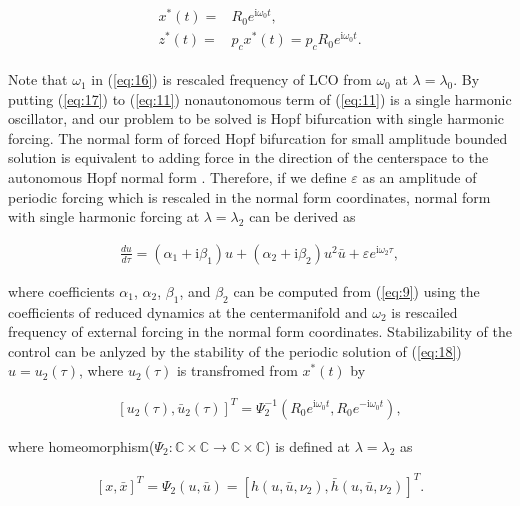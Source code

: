\documentclass[openacc]{rsproca_new}%
\def\complex{\mathbb{C}}
\def\epsilon{\varepsilon}
\newcommand{\Eref}[1]{(\ref{#1})}
\begin{document}
\begin{align}\label{eq:17}
    \begin{split}
x^*(t)=&R_0e^{\textrm{i}\omega_0 t},\\
z^*(t)=&p_cx^*(t)=p_cR_0e^{\textrm{i}\omega_0 t}.
\end{split}
\end{align}

\noindent Note that $\omega_1$ in \Eref{eq:16} is rescaled frequency of LCO from $\omega_0$ at $\lambda=\lambda_0$. By putting \Eref{eq:17} to \Eref{eq:11} nonautonomous term of \Eref{eq:11} is a single harmonic oscillator, and our problem to be solved is Hopf bifurcation with single harmonic forcing. The normal form of forced Hopf bifurcation for small amplitude bounded solution is equivalent to adding force in the direction of the centerspace to the autonomous Hopf normal form \cite{golubitsky2012feed,elphick1987normal}. Therefore, if we define $\epsilon$ as an amplitude of periodic forcing which is rescaled in the normal form coordinates, normal form with single harmonic forcing at $\lambda=\lambda_2$ can be derived as

\begin{align}\label{eq:18}
  \frac{du}{d\tau}=(\alpha_1+\textrm{i}\beta_1)u+(\alpha_2+\textrm{i}\beta_2)u^2\bar u+\epsilon e^{\textrm{i}\omega_2\tau},
\end{align}

\noindent where coefficients $\alpha_1$, $\alpha_2$, $\beta_1$, and $\beta_2$ can be computed from \Eref{eq:9} using the coefficients of reduced dynamics at the centermanifold and $\omega_2$ is rescailed frequency of external forcing in the normal form coordinates. Stabilizability of the control can be anlyzed by the stability of the periodic solution of \Eref{eq:18} $u=u_2(\tau)$, where $u_2(\tau)$ is transfromed from $x^*(t)$ by


\begin{align}\label{eq:19}
[u_2(\tau),\bar u_2(\tau)]^T = \Psi_2^{-1}(R_0e^{\textrm{i}\omega_0 t},R_0e^{-\textrm{i}\omega_0 t}),
\end{align}

\noindent where homeomorphism($\Psi_2:\complex\times\complex\rightarrow\complex\times\complex$) is defined at $\lambda=\lambda_2$ as

\begin{align}\label{eq:hm}
[x,\bar x]^T=\Psi_2(u,\bar u)=[h(u,\bar u,\nu_2),\bar h(u,\bar u,\nu_2)]^T.
\end{align}
\end{document}

